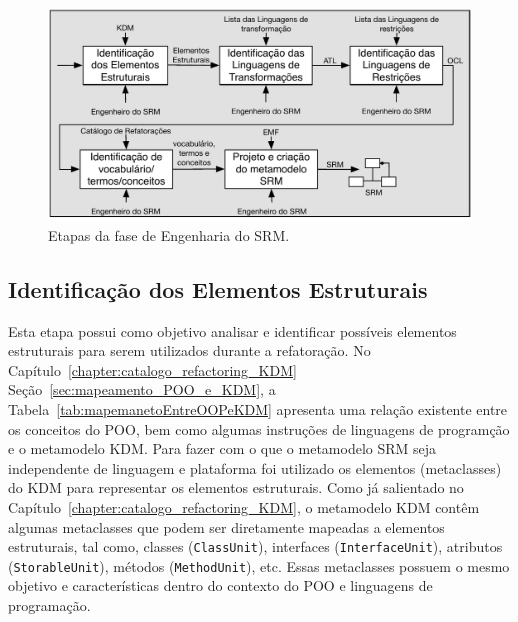\begin{figure}[h]
	\centering
	\caption{Etapas da fase de Engenharia do SRM.}
	\label{fig:etapas_da_fase_de_e_do_SRM}
	\includegraphics[scale=0.75]{images/todasAsFasesDaEngenhariaDOSRM6}
	\fautor
\end{figure}



\subsection{Identificação dos Elementos Estruturais}

Esta etapa possui como objetivo analisar e identificar possíveis elementos estruturais para serem utilizados durante a refatoração. No Capítulo~\ref{chapter:catalogo_refactoring_KDM} Seção~\ref{sec:mapeamento_POO_e_KDM}, a Tabela~\ref{tab:mapemanetoEntreOOPeKDM} apresenta uma relação existente entre os conceitos do POO, bem como algumas instruções de linguagens de programção e o metamodelo KDM. Para fazer com o que o metamodelo SRM seja independente de linguagem e plataforma foi utilizado os elementos (metaclasses) do KDM para representar os elementos estruturais. Como já salientado no Capítulo~\ref{chapter:catalogo_refactoring_KDM}, o metamodelo KDM contêm algumas metaclasses que podem ser diretamente mapeadas a elementos estruturais, tal como, classes (\texttt{ClassUnit}), interfaces (\texttt{InterfaceUnit}), atributos (\texttt{StorableUnit}), métodos (\texttt{MethodUnit}), etc. Essas metaclasses possuem o mesmo objetivo e características dentro do contexto do POO e linguagens de programação. %

